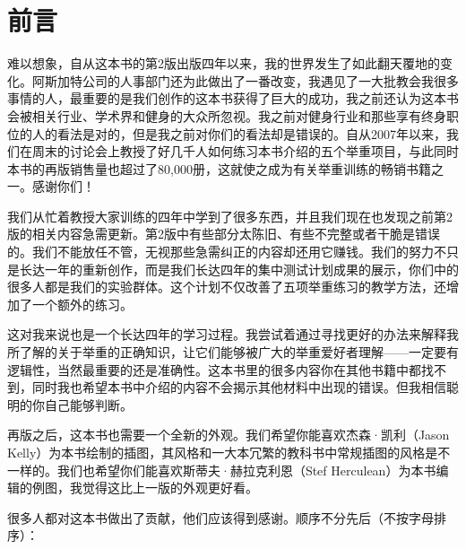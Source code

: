 \chapter*{前言}

难以想象，自从这本书的第2版出版四年以来，我的世界发生了如此翻天覆地的变化。阿斯加特公司的人事部门还为此做出了一番改变，我遇见了一大批教会我很多事情的人，最重要的是我们创作的这本书获得了巨大的成功，我之前还认为这本书会被相关行业、学术界和健身的大众所忽视。我之前对健身行业和那些享有终身职位的人的看法是对的，但是我之前对你们的看法却是错误的。自从2007年以来，我们在周末的讨论会上教授了好几千人如何练习本书介绍的五个举重项目，与此同时本书的再版销售量也超过了80,000册，这就使之成为有关举重训练的畅销书籍之一。感谢你们！

我们从忙着教授大家训练的四年中学到了很多东西，并且我们现在也发现之前第2版的相关内容急需更新。第2版中有些部分太陈旧、有些不完整或者干脆是错误的。我们不能放任不管，无视那些急需纠正的内容却还用它赚钱。我们的努力不只是长达一年的重新创作，而是我们长达四年的集中测试计划成果的展示，你们中的很多人都是我们的实验群体。这个计划不仅改善了五项举重练习的教学方法，还增加了一个额外的练习。

这对我来说也是一个长达四年的学习过程。我尝试着通过寻找更好的办法来解释我所了解的关于举重的正确知识，让它们能够被广大的举重爱好者理解——一定要有逻辑性，当然最重要的还是准确性。这本书里的很多内容你在其他书籍中都找不到，同时我也希望本书中介绍的内容不会揭示其他材料中出现的错误。但我相信聪明的你自己能够判断。

再版之后，这本书也需要一个全新的外观。我们希望你能喜欢杰森·凯利（Jason Kelly）为本书绘制的插图，其风格和一大本冗繁的教科书中常规插图的风格是不一样的。我们也希望你们能喜欢斯蒂夫·赫拉克利恩（Stef Herculean）为本书编辑的例图，我觉得这比上一版的外观更好看。

很多人都对这本书做出了贡献，他们应该得到感谢。顺序不分先后（不按字母排序）：

